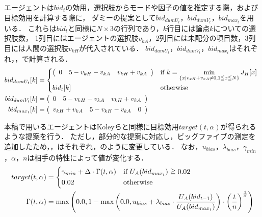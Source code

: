 エージェントは$bid_t$の効用，選択肢からモードや因子の値を推定する際，および目標効用を計算する際に，
ダミーの提案として$bid_{dumU_t}$，$bid_{dumV_t}$，$bid_{max_t}$を用いる．
これらは$bid_t$と同様に$N \times 3$の行列であり，$k$行目には論点$k$についての選択肢数，
1列目にはエージェントの選択肢$v_{kA}$，2列目には未配分の項目数，3列目には人間の選択肢$v_{kH}$が代入されている．
$bid_{dumU_t}$，$bid_{dumV_t}$，$bid_{max_t}$はそれぞれ，，で計算される．
\begin{align}
    bid_{dumU_t}[k] &= 
    \begin{cases*}
        \left(
    \begin{array}{rrr}
        0 & 5 - v_{kH} - v_{kA} & v_{kH} + v_{kA}
    \end{array}
    \right) & if $k = \displaystyle \min_{\{x | v_{xH} + v_{xA} \neq 0, 1 \leqq x \leqq N \} } J_H[x]$ \\
        bid_t[k] & otherwise
    \end{cases*}
    \label{eq:dummyutil} \\
    bid_{dumV_t}[k] &= 
        \left(
    \begin{array}{rrr}
        0 & 5 - v_{kH} - v_{kA} & v_{kH} + v_{kA}
    \end{array}
    \right)
    \label{eq:dummyvalue} \\
    bid_{max_t}[k] &= 
        \left(
    \begin{array}{rrr}
        v_{kH} + v_{kA} & 5 - v_{kH} - v_{kA} & 0
    \end{array}
    \right)
    \label{eq:maxutil} 
\end{align}

本稿で用いるエージェントはKoleyらと同様に目標効用$target(t,\alpha)$が得られるような提案を行う．
ただし，部分的な提案に対応し，ビッグファイブの測定を追加したため，，はそれぞれ，のように変更している．
なお，$u_{bias}$，$\lambda_{bias}$，$\gamma_{min}$，$\alpha$，$n$は相手の特性によって値が変化する．
\begin{align}
    target(t,\alpha) &= 
    \begin{cases*}
        \gamma_{min} + \Delta \cdot \Gamma(t,\alpha) & if $U_A(bid_{max_t}) \geqq 0.02$  \\
        0.02 & otherwise 
    \end{cases*} \label{eq:newtarget}\\
    \Gamma(t,\alpha) &= \max \left( 0.0, 1 - \max \left( 0.0, u_{bias} + \lambda_{bias} \cdot \frac{U_A(bid_{t - 1})}{U_A(bid_{max_t})} \right) \cdot \left( \frac{t}{n} \right)^{\frac{1}{\alpha}} \right) \label{eq:newgamma}
\end{align}

